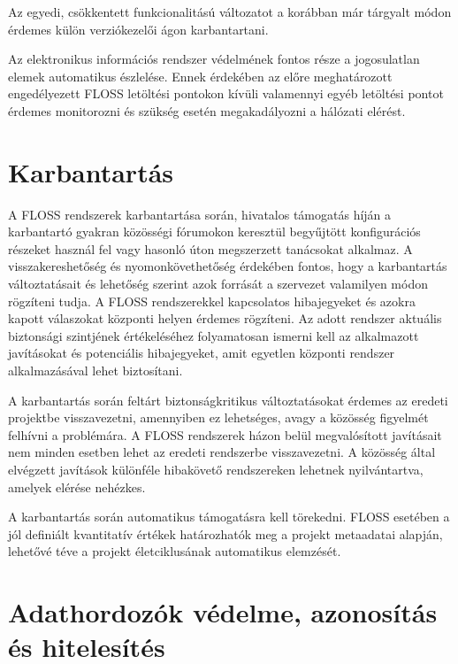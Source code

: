 \documentclass[12pt,magyar,a4paper,oneside]{scrreprt}
\begin{document}
Az egyedi, csökkentett funkcionalitású változatot a korábban már
tárgyalt módon érdemes külön verziókezelői ágon karbantartani.

Az elektronikus információs rendszer védelmének fontos része a
jogosulatlan elemek automatikus észlelése. Ennek érdekében az előre
meghatározott engedélyezett FLOSS letöltési pontokon kívüli valamennyi
egyéb letöltési pontot érdemes monitorozni és szükség esetén
megakadályozni a hálózati elérést.

\hypertarget{karbantartuxe1s}{%
\section{Karbantartás}\label{karbantartuxe1s}}

A FLOSS rendszerek karbantartása során, hivatalos támogatás híján a
karbantartó gyakran közösségi fórumokon keresztül begyűjtött
konfigurációs részeket használ fel vagy hasonló úton megszerzett
tanácsokat alkalmaz. A visszakereshetőség és nyomonkövethetőség
érdekében fontos, hogy a karbantartás változtatásait és lehetőség
szerint azok forrását a szervezet valamilyen módon rögzíteni tudja. A
FLOSS rendszerekkel kapcsolatos hibajegyeket és azokra kapott válaszokat
központi helyen érdemes rögzíteni. Az adott rendszer aktuális biztonsági
szintjének értékeléséhez folyamatosan ismerni kell az alkalmazott
javításokat és potenciális hibajegyeket, amit egyetlen központi rendszer
alkalmazásával lehet biztosítani.

A karbantartás során feltárt biztonságkritikus változtatásokat érdemes
az eredeti projektbe visszavezetni, amennyiben ez lehetséges, avagy a
közösség figyelmét felhívni a problémára. A FLOSS rendszerek házon belül
megvalósított javításait nem minden esetben lehet az eredeti rendszerbe
visszavezetni. A közösség által elvégzett javítások különféle hibakövető
rendszereken lehetnek nyilvántartva, amelyek elérése nehézkes.

A karbantartás során automatikus támogatásra kell törekedni. FLOSS
esetében a jól definiált kvantitatív értékek határozhatók meg a projekt
metaadatai alapján, lehetővé téve a projekt életciklusának automatikus
elemzését.

\hypertarget{adathordozuxf3k-vuxe9delme-azonosuxedtuxe1s-uxe9s-hitelesuxedtuxe9s}{%
\section{Adathordozók védelme, azonosítás és
hitelesítés}\label{adathordozuxf3k-vuxe9delme-azonosuxedtuxe1s-uxe9s-hitelesuxedtuxe9s}}
\end{document}
